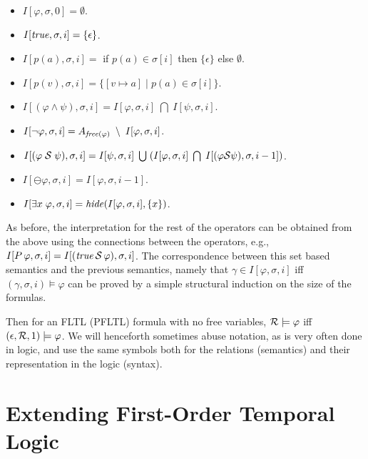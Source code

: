 \begin{itemize}
\item $I [ \varphi , \sigma , 0 ] = \emptyset$.
\item $I [ \mathit{true} , \sigma , i ] = \{ \epsilon \}$.
\item $I [ p ( a ) , \sigma , i ] =$ if $p ( a ) \in \sigma [ i ]$ then
$\{ \epsilon \}$ else $\emptyset$.
\item $I [ p ( v ) , \sigma , i ] = \{ [ v \mapsto a ] \; | \; p ( a ) \in
\sigma [ i ] \}$.
\item $I [ ( \varphi \wedge \psi ) , \sigma , i ] = 
I [ \varphi , \sigma , i ] \;  \bigcap \; I [ \psi , \sigma , i ]$.
\item $I [ \neg \varphi , \sigma , i ] = 
A_{\mathit{free} ( \varphi )} \; \setminus \; I [ \varphi , \sigma , i ]$.
\item $I [ ( \varphi \; {\cal S} \; \psi ) , \sigma , i ] = 
I [ \psi , \sigma , i ] \; \bigcup \;
( I [ \varphi , \sigma , i ] \; \bigcap \; 
I [ (\varphi {\cal S} \psi ) , \sigma , i - 1 ] )$.
\item $I [ \ominus \varphi , \sigma , i ] = I [ \varphi , \sigma , i-1 ]$.
\item $I [ \exists x \; \varphi , \sigma , i ] = 
\mathit{hide} ( I [ \varphi , \sigma , i ] , \{ x \} )$.
\end{itemize}

\noindent
As before, the interpretation for the rest of the operators can
be obtained from the above using the connections between the operators,
e.g., $I [ P \, \varphi  , \sigma , i ] = 
I [ ( \mathit{true} \, {\cal S} \, \varphi ) , \sigma , i ]$.
The correspondence between this set based semantics 
and the previous semantics, namely that
$\gamma \in I [ \varphi , \sigma, i ]$ iff
$( \gamma , \sigma , i ) \models \varphi$
can be proved by a simple structural induction on
the size of the formulas.
 \fi

Then for an FLTL (PFLTL) formula with no free variables, ${\cal R} \models \varphi$ iff $( \epsilon , {\cal R} , 1 ) \models \varphi$.
We will henceforth sometimes abuse notation, as is very often done in logic, and use the same
symbols both for the relations (semantics) and their representation in
the logic (syntax).

\section{Extending First-Order Temporal Logic}

